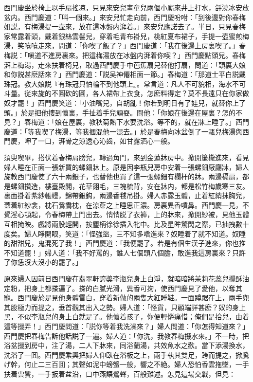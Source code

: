 西門慶坐於椅上以手扇搖凉，只見來安兒畫童兒兩個小廝來井上打水，㧱澆冰安放盆内。西門慶道：「呌一個來。」來安兒忙走向前，西門慶吩咐：「到後邊對你春梅姐説，有梅湯提一壶來，放在這冰盤内湃着。」來安兒應諾去了。半日，只見春梅家常露着頭，戴着銀絲雲髻兒，穿着毛青布褂兒，桃紅夏布裙子，手提一壺蜜煎梅湯，笑嘻嘻走來，問道：「你喫了飯了？」西門慶道：「我在後邊上房裏喫了。」春梅説：「嗔道不進房裏來。把這梅湯放在冰盤内湃着你喫？」西門慶點頭兒。春梅湃上梅湯，走來扶着椅兒，取過西門慶手中芭蕉扇兒替他打扇，問道：「頭裏大娘和你説甚麽話來？」西門慶道：「説吴神僊相面一節。」春梅道：「那道士平白説戴珠冠。教大娘説『有珠冠只怕輪不到他頭上』。常言道：凡人不可貌相，海水不可斗量。従來旋的不圓砍的圓，各人裙帶上衣食，怎麽料得定？莫不長遠只在你家做奴才罷！」西門慶笑道：「小油嘴兒，自胡亂！你若到明日有了娃兒，就替你上了頭。」於是把他摟到懷裏，手扯着手兒頑耍。問他：「你娘在後邊在屋裏？怎的不見？」春梅道：「娘在屋裏，教秋菊熱下水要洗浴。等不的，就在牀上睡了。」西門慶道：「等我喫了梅湯，等我摑混他一混去。」於是春梅向冰盆倒了一甌兒梅湯與西門慶，呷了一口，湃骨之涼透心沁齒，如甘露洒心一般。

須臾喫畢，搭伏着春梅肩膀兒，轉過角門，來到金蓮牀房中。掀開簾櫳進來，看見婦人睡在正面一張新買的螺鈿牀上。原是因李瓶兒房中安着一張螺鈿厰廳牀，婦人旋教西門慶使了六十兩銀子，也替他也買了這一張螺鈿有欄杆的牀。兩邊槅扇，都是螺鈿攢造，樓臺殿閣，花草翎毛，三塊梳背，安在牀内，都是松竹梅歲寒三友。裏面掛着紫紗帳幔，錦帶銀鈎，兩邊香毬吊掛。婦人赤露玉體，止着紅綃抹胸兒，蓋着紅紗衾，枕石鴛鴦枕，在涼蓆之上睡思正濃。房裏異香噴鼻。西門慶一見，不覺淫心頓起，令春梅帶上門出去。悄悄脱了衣褲，上的牀來，掀開紗被，見他玉體互相掩映。戲將兩股輕開，按麈柄徐徐插入牝中。比及星眸驚閃之際，已抽拽數十度矣。婦人睜開眼，笑道：「怪強盜，三不知多喒進來？奴睡着了就不知道。奴睡的甜甜兒，鬼混死了我！」西門慶道：「我便罷了。若是有個生漢子進來，你也推不知道罷！」婦人道：「我不好罵的，誰人七個頭八個膽，敢進我這房裏來？只許了你恁沒大沒小的罷了。」

原來婦人因前日西門慶在翡翠軒誇獎李瓶兒身上白淨，就暗暗將茉莉花蕊兒攪酥油定粉，把身上都搽遍了。搽的白膩光滑，異香可掬，使西門慶見了愛他，以奪其寵。西門慶於是見他身體雪白，穿着新做的兩隻大紅睡鞋。一面蹲踞在上，兩手兜其股極力而提之，垂首觀其出入之勢。婦人道：「怪貨，只顧端詳甚麽？奴的身上黑，不似李瓶兒的身上白就是了。他懷着孩子，你便輕憐痛惜；俺們是拾兒，由着這等掇弄！」西門慶問道：「説你等着我洗澡來？」婦人問道：「你怎得知道來？」西門慶把春梅告訴他話説了一遍。婦人道：「你洗，我教春梅掇水來。」不一時，把浴盆掇到房中，注了湯，二人下牀來，同浴蘭湯，共效魚水之歡。當下添湯換水，洗浴了一囬。西門慶乘興把婦人仰臥在浴板之上，兩手執其雙足，跨而提之，掀騰げ幹，何止二三百囬；其聲如泥中螃蟹一般，響之不絶。婦人恐怕香雲拖墜，一手扶着雲鬢，一手扳着盆沿，口中燕語鶯聲，百般難述。怎見這場交戰，但見：

